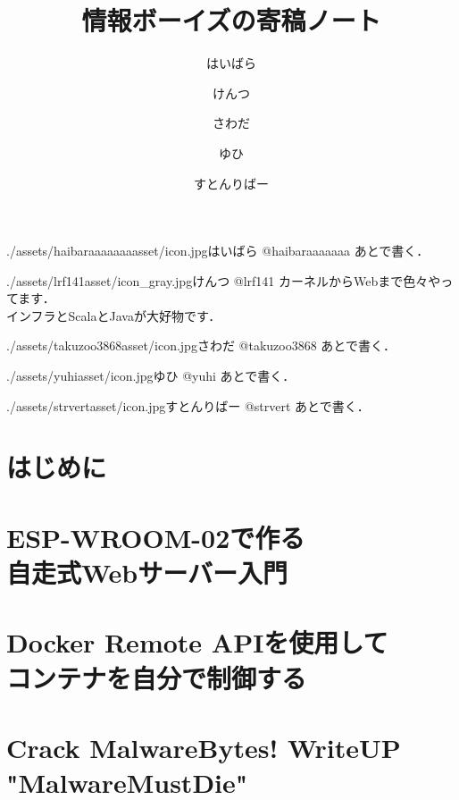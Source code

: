 \documentclass[autodetect-engine,dvipdfmx-if-dvi,ja=standard,b5paper,10.5pt,twoside,openany,layout=v2]{bxjsbook}
\title{情報ボーイズの寄稿ノート}
\author{はいばら \and けんつ \and さわだ \and ゆひ \and すとんりばー}
\date{}
\newcommand{\articlepath}{./articles}
\newcommand{\assetspath}{./assets}
\newcommand{\lrfasset}{\assetspath/lrf141asset}
\newcommand{\strvertasset}{\assetspath/strvertasset}
\newcommand{\haibaraaaaaaaasset}{\assetspath/haibaraaaaaaaasset}
\newcommand{\yuhiasset}{\assetspath/yuhiasset}
\newcommand{\takuzooasset}{\assetspath/takuzoo3868asset}
\begin{document}
\frontmatter
\maketitle
\begin{myintroduce}{\haibaraaaaaaaasset/icon.jpg}{はいばら @haibaraaaaaaa}
  あとで書く．
\end{myintroduce}
\begin{myintroduce}{\lrfasset/icon_gray.jpg}{けんつ @lrf141}
  カーネルからWebまで色々やってます．\\
  インフラとScalaとJavaが大好物です．
\end{myintroduce}
\begin{myintroduce}{\takuzooasset/icon.jpg}{さわだ @takuzoo3868}
  あとで書く．
\end{myintroduce}
\begin{myintroduce}{\yuhiasset/icon.jpg}{ゆひ @yuhi}
  あとで書く．
\end{myintroduce}
\begin{myintroduce}{\strvertasset/icon.jpg}{すとんりばー @strvert}
  あとで書く．
\end{myintroduce}

\chapter{はじめに}
\addtolength{\oddsidemargin}{10pt}
\addtolength{\evensidemargin}{-10pt}


\tableofcontents
\mainmatter

\chapter{ESP-WROOM-02で作る \\自走式Webサーバー入門}


\chapter{Docker Remote APIを使用して\\コンテナを自分で制御する}


\chapter{Crack MalwareBytes! WriteUP "MalwareMustDie"}

\end{document}
